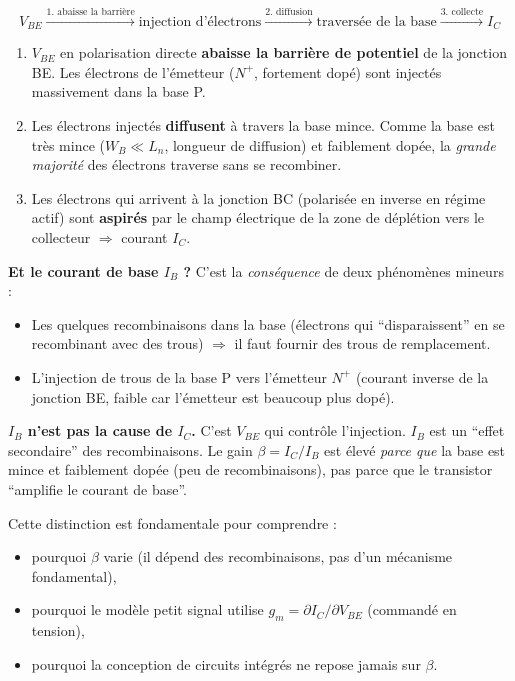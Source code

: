 \documentclass[12pt,a4paper,twoside]{book}
\begin{document}
\begin{formule}
\[
\boxed{V_{BE} \xrightarrow{\text{1. abaisse la barrière}} \text{injection d'électrons} \xrightarrow{\text{2. diffusion}} \text{traversée de la base} \xrightarrow{\text{3. collecte}} I_C}
\]
\begin{enumerate}[nosep]
\item $V_{BE}$ en polarisation directe \textbf{abaisse la barrière de potentiel} de la jonction BE. Les électrons de l'émetteur ($N^+$, fortement dopé) sont injectés massivement dans la base P.
\item Les électrons injectés \textbf{diffusent} à travers la base mince. Comme la base est très mince ($W_B \ll L_n$, longueur de diffusion) et faiblement dopée, la \textit{grande majorité} des électrons traverse sans se recombiner.
\item Les électrons qui arrivent à la jonction BC (polarisée en inverse en régime actif) sont \textbf{aspirés} par le champ électrique de la zone de déplétion vers le collecteur $\Rightarrow$ courant $I_C$.
\end{enumerate}

\textbf{Et le courant de base $I_B$ ?} C'est la \textit{conséquence} de deux phénomènes mineurs :
\begin{itemize}[nosep]
\item Les quelques recombinaisons dans la base (électrons qui ``disparaissent'' en se recombinant avec des trous) $\Rightarrow$ il faut fournir des trous de remplacement.
\item L'injection de trous de la base P vers l'émetteur $N^+$ (courant inverse de la jonction BE, faible car l'émetteur est beaucoup plus dopé).
\end{itemize}
\end{formule}

\begin{attention}
\textbf{$I_B$ n'est pas la cause de $I_C$.} C'est $V_{BE}$ qui contrôle l'injection. $I_B$ est un ``effet secondaire'' des recombinaisons. Le gain $\beta = I_C/I_B$ est élevé \textit{parce que} la base est mince et faiblement dopée (peu de recombinaisons), pas parce que le transistor ``amplifie le courant de base''.

Cette distinction est fondamentale pour comprendre :
\begin{itemize}[nosep]
\item pourquoi $\beta$ varie (il dépend des recombinaisons, pas d'un mécanisme fondamental),
\item pourquoi le modèle petit signal utilise $g_m = \partial I_C/\partial V_{BE}$ (commandé en tension),
\item pourquoi la conception de circuits intégrés ne repose jamais sur $\beta$.
\end{itemize}
\end{attention}
\end{document}
